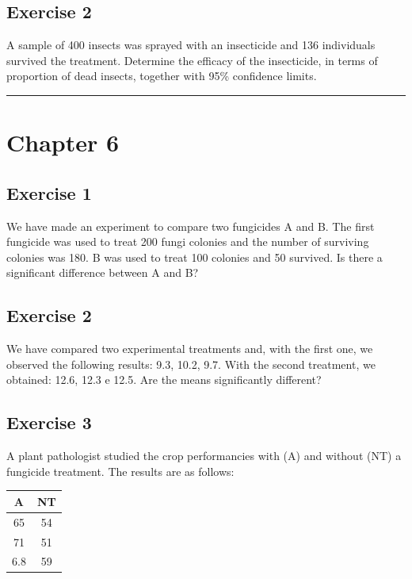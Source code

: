 \documentclass[a4paper,12pt,oneside]{book}
\begin{document}
\hypertarget{exercise-2-2}{%
\subsection{Exercise 2}\label{exercise-2-2}}

A sample of 400 insects was sprayed with an insecticide and 136 individuals survived the treatment. Determine the efficacy of the insecticide, in terms of proportion of dead insects, together with 95\% confidence limits.

\begin{center}\rule{0.5\linewidth}{0.5pt}\end{center}

\hypertarget{chapter-6}{%
\section{Chapter 6}\label{chapter-6}}

\hypertarget{exercise-1-3}{%
\subsection{Exercise 1}\label{exercise-1-3}}

We have made an experiment to compare two fungicides A and B. The first fungicide was used to treat 200 fungi colonies and the number of surviving colonies was 180. B was used to treat 100 colonies and 50 survived. Is there a significant difference between A and B?

\hypertarget{exercise-2-3}{%
\subsection{Exercise 2}\label{exercise-2-3}}

We have compared two experimental treatments and, with the first one, we observed the following results: 9.3, 10.2, 9.7. With the second treatment, we obtained: 12.6, 12.3 e 12.5. Are the means significantly different?

\hypertarget{exercise-3-2}{%
\subsection{Exercise 3}\label{exercise-3-2}}

A plant pathologist studied the crop performancies with (A) and without (NT) a fungicide treatment. The results are as follows:

\begin{longtable}[]{@{}cc@{}}
\toprule
A & NT \\
\midrule
\endhead
65 & 54 \\
71 & 51 \\
6.8 & 59 \\
\bottomrule
\end{longtable}
\end{document}
